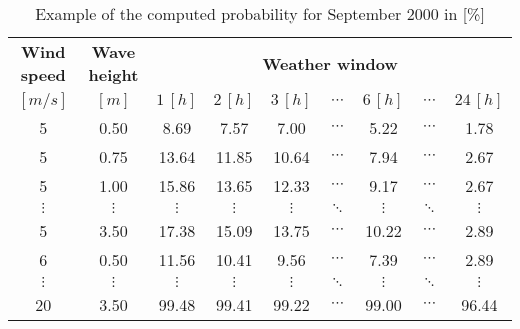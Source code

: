 \begin{table}
\label{tab:proba}
\begin{tabular}{ccccccccc}
\hline
{\bf Wind speed} & {\bf Wave height} & \multicolumn{ 7}{c}{{\bf Weather window}} \\
$[m/s]$      &      $[m]$      &          $1\, [h]$ &          $2\, [h]$ &          $3\, [h]$ &  $\cdots$ & $6\, [h]$  & $\cdots$ &        $24\, [h]$ \\
\hline
5 &       0.50 &       8.69 &       7.57 &       7.00 &  $\cdots$ & 5.22 & $\cdots$ &      1.78 \\
5 &       0.75 &      13.64 &      11.85 &      10.64 &  $\cdots$ & 7.94 & $\cdots$ &      2.67 \\
5 &       1.00 &      15.86 &      13.65 &      12.33 &  $\cdots$ & 9.17 & $\cdots$ &      2.67 \\
 $\vdots$ &  $\vdots$ &  $\vdots$ &  $\vdots$ &  $\vdots$ &  $\ddots$ & $\vdots$ & $\ddots$ &  $\vdots$ \\
5 &       3.50 &      17.38 &      15.09 &      13.75 &  $\cdots$ & 10.22 & $\cdots$ &       2.89 \\
6 &       0.50 &      11.56 &      10.41 &       9.56 &  $\cdots$ & 7.39 & $\cdots$ &      2.89 \\
 $\vdots$ &  $\vdots$ &  $\vdots$ &  $\vdots$ &  $\vdots$ & $\ddots$ & $\vdots$ &        $\ddots$ &  $\vdots$ \\
20 &       3.50 &      99.48 &      99.41 &      99.22 &  $\cdots$ & 99.00 & $\cdots$ &      96.44 \\
\hline
\end{tabular}  

\caption{Example of the computed probability for September 2000 in [\%]}
\end{table}